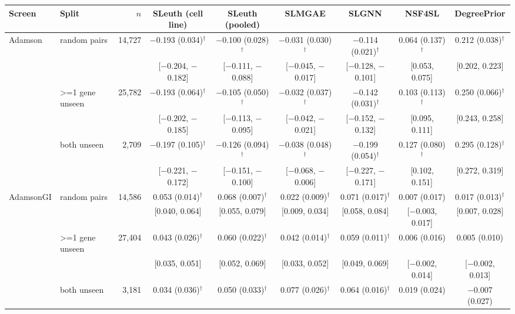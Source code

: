 \begin{tabular}{llr|cccccc}
\hline
Screen & Split & $n$ & SLeuth (cell line) & SLeuth (pooled) & SLMGAE & SLGNN & NSF4SL & DegreePrior \\
\hline
Adamson & random pairs & 14,727 & $-$0.193 (0.034)$^\dagger$ & $-$0.100 (0.028)$^\dagger$ & $-$0.031 (0.030)$^\dagger$ & $-$0.114 (0.021)$^\dagger$ & 0.064 (0.137)$^\dagger$ & 0.212 (0.038)$^\dagger$ \\
 & & & \scriptsize[$-$0.204, $-$0.182] & \scriptsize[$-$0.111, $-$0.088] & \scriptsize[$-$0.045, $-$0.017] & \scriptsize[$-$0.128, $-$0.101] & \scriptsize[0.053, 0.075] & \scriptsize[0.202, 0.223] \\
 & >=1 gene unseen & 25,782 & $-$0.193 (0.064)$^\dagger$ & $-$0.105 (0.050)$^\dagger$ & $-$0.032 (0.037)$^\dagger$ & $-$0.142 (0.031)$^\dagger$ & 0.103 (0.113)$^\dagger$ & 0.250 (0.066)$^\dagger$ \\
 & & & \scriptsize[$-$0.202, $-$0.185] & \scriptsize[$-$0.113, $-$0.095] & \scriptsize[$-$0.042, $-$0.021] & \scriptsize[$-$0.152, $-$0.132] & \scriptsize[0.095, 0.111] & \scriptsize[0.243, 0.258] \\
 & both unseen & 2,709 & $-$0.197 (0.105)$^\dagger$ & $-$0.126 (0.094)$^\dagger$ & $-$0.038 (0.048)$^\dagger$ & $-$0.199 (0.054)$^\dagger$ & 0.127 (0.080)$^\dagger$ & 0.295 (0.128)$^\dagger$ \\
 & & & \scriptsize[$-$0.221, $-$0.172] & \scriptsize[$-$0.151, $-$0.100] & \scriptsize[$-$0.068, $-$0.006] & \scriptsize[$-$0.227, $-$0.171] & \scriptsize[0.102, 0.151] & \scriptsize[0.272, 0.319] \\
\hline
AdamsonGI & random pairs & 14,586 & 0.053 (0.014)$^\dagger$ & 0.068 (0.007)$^\dagger$ & 0.022 (0.009)$^\dagger$ & 0.071 (0.017)$^\dagger$ & 0.007 (0.017) & 0.017 (0.013)$^\dagger$ \\
 & & & \scriptsize[0.040, 0.064] & \scriptsize[0.055, 0.079] & \scriptsize[0.009, 0.034] & \scriptsize[0.058, 0.084] & \scriptsize[$-$0.003, 0.017] & \scriptsize[0.007, 0.028] \\
 & >=1 gene unseen & 27,404 & 0.043 (0.026)$^\dagger$ & 0.060 (0.022)$^\dagger$ & 0.042 (0.014)$^\dagger$ & 0.059 (0.011)$^\dagger$ & 0.006 (0.016) & 0.005 (0.010) \\
 & & & \scriptsize[0.035, 0.051] & \scriptsize[0.052, 0.069] & \scriptsize[0.033, 0.052] & \scriptsize[0.049, 0.069] & \scriptsize[$-$0.002, 0.014] & \scriptsize[$-$0.002, 0.013] \\
 & both unseen & 3,181 & 0.034 (0.036)$^\dagger$ & 0.050 (0.033)$^\dagger$ & 0.077 (0.026)$^\dagger$ & 0.064 (0.016)$^\dagger$ & 0.019 (0.024) & $-$0.007 (0.027) \\

\end{tabular}
